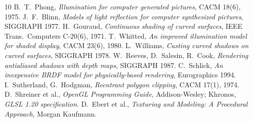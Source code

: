 \documentclass[10pt,a4paper]{article}
\begin{document}
\begin{thebibliography}{10}\footnotesize
{} B.~T.~Phong, \emph{Illumination for computer generated pictures}, CACM 18(6), 1975.
 J.~F.~Blinn, \emph{Models of light reflection for computer synthesized pictures}, SIGGRAPH 1977.
 H.~Gouraud, \emph{Continuous shading of curved surfaces}, IEEE Trans.\ Computers C-20(6), 1971.
 T.~Whitted, \emph{An improved illumination model for shaded display}, CACM 23(6), 1980.
 L.~Williams, \emph{Casting curved shadows on curved surfaces}, SIGGRAPH 1978.
 W.~Reeves, D.~Salesin, R.~Cook, \emph{Rendering antialiased shadows with depth maps}, SIGGRAPH 1987.
 C.~Schlick, \emph{An inexpensive BRDF model for physically-based rendering}, Eurographics 1994.
 I.~Sutherland, G.~Hodgman, \emph{Reentrant polygon clipping}, CACM 17(1), 1974.
 D.~Shreiner et al., \emph{OpenGL Programming Guide}, Addison-Wesley; Khronos, \emph{GLSL 1.20 specification}.
 D.~Ebert et al., \emph{Texturing and Modeling: A Procedural Approach}, Morgan Kaufmann.
\end{thebibliography}
\end{document}
